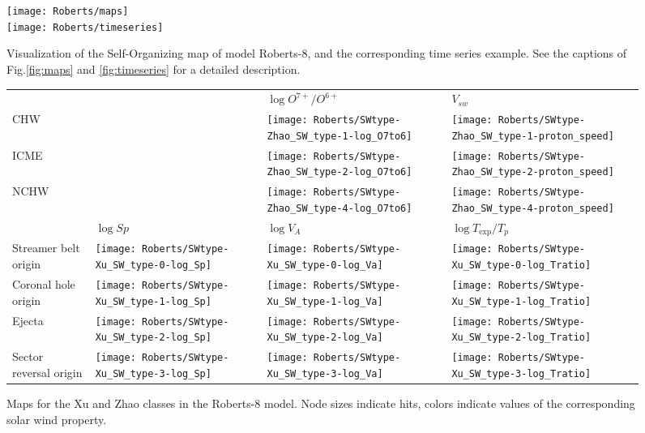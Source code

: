 \documentclass[utf8]{frontiersSCNS} %
\begin{document}
\begin{figure}[h!]
	\begin{center}
		\texttt{[image: Roberts/maps]}\\%
			\texttt{[image: Roberts/timeseries]}
	\end{center}
	\caption{Visualization of the Self-Organizing map of model Roberts-8, and the corresponding time series example. See the captions of Fig.\ref{fig:maps}  and \ref{fig:timeseries} for a detailed description.}\label{fig:modelR}
\end{figure}

\begin{figure}[h!]\centering
	\begin{tabular}{m{2.5cm}CCC}
		 & & $\log O^{7+}/O^{6+}$ & $V_{sw}$ \\
		CHW & & \texttt{[image: Roberts/SWtype-Zhao\_SW\_type-1-log\_O7to6]} &
		\texttt{[image: Roberts/SWtype-Zhao\_SW\_type-1-proton\_speed]}\hfill	\\
		ICME & & \texttt{[image: Roberts/SWtype-Zhao\_SW\_type-2-log\_O7to6]} &
		\texttt{[image: Roberts/SWtype-Zhao\_SW\_type-2-proton\_speed]}\hfill	\\
		NCHW & & \texttt{[image: Roberts/SWtype-Zhao\_SW\_type-4-log\_O7to6]} &
		\texttt{[image: Roberts/SWtype-Zhao\_SW\_type-4-proton\_speed]}\hfill \\
		& $\log Sp$ & $\log V_{A}$ & $\log T_{\text{exp}}/T_p$ \\
		Streamer belt origin & \texttt{[image: Roberts/SWtype-Xu\_SW\_type-0-log\_Sp]} &
		\texttt{[image: Roberts/SWtype-Xu\_SW\_type-0-log\_Va]} &
		\texttt{[image: Roberts/SWtype-Xu\_SW\_type-0-log\_Tratio]} \hfill	\\
		
		Coronal hole origin & \texttt{[image: Roberts/SWtype-Xu\_SW\_type-1-log\_Sp]} &
		\texttt{[image: Roberts/SWtype-Xu\_SW\_type-1-log\_Va]} &
		\texttt{[image: Roberts/SWtype-Xu\_SW\_type-1-log\_Tratio]} \hfill	\\
		
		Ejecta & \texttt{[image: Roberts/SWtype-Xu\_SW\_type-2-log\_Sp]} &
		\texttt{[image: Roberts/SWtype-Xu\_SW\_type-2-log\_Va]} &
		\texttt{[image: Roberts/SWtype-Xu\_SW\_type-2-log\_Tratio]} \hfill	\\
		
		Sector reversal origin & \texttt{[image: Roberts/SWtype-Xu\_SW\_type-3-log\_Sp]} &
		\texttt{[image: Roberts/SWtype-Xu\_SW\_type-3-log\_Va]} &
		\texttt{[image: Roberts/SWtype-Xu\_SW\_type-3-log\_Tratio]} \hfill	\\
	\end{tabular}
	\caption{Maps for the Xu and Zhao classes in the Roberts-8 model. Node sizes indicate hits, colors indicate values of the corresponding solar wind property.}\label{fig:SWtXuRoberts}
\end{figure}
\end{document}
